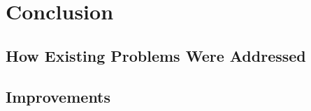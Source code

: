 \section{Conclusion}

\subsection{How Existing Problems Were Addressed}

\subsection{Improvements}

\newpage
